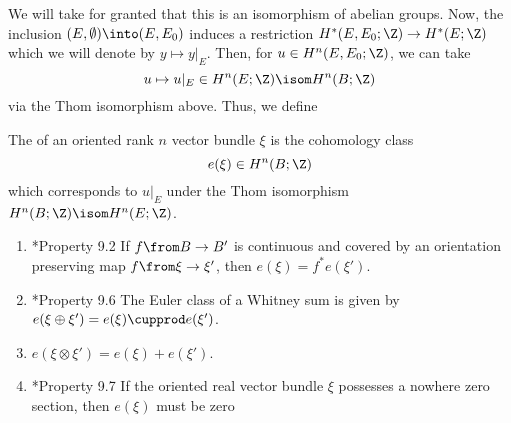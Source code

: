 \documentclass[11pt,leqno,oneside]{amsbook}
\numberwithin{thm}{section}
\begin{document}
We will take for granted that this is an isomorphism of abelian
groups. Now, the inclusion \((E, \emptyset) \into (E, E_0)\) induces a
restriction \(H^*(E,E_0;\Z) \to H^*(E;\Z)\) which we will denote by
\(y \mapsto y|_E\). Then, for \(u \in H^n(E,E_0;\Z)\), we can take \[
  u \mapsto u|_E \in H^n(E;\Z) \isom H^n(B;\Z)
\]
via the Thom isomorphism above. Thus, we define
\begin{defn}
  The  of an oriented rank \(n\) vector bundle \(\xi\)
  is the cohomology class \[
    e(\xi) \in H^n(B;\Z)
  \]
  which corresponds to \(u|_E\) under the Thom isomorphism
  \(H^n(B;\Z) \isom H^n(E;\Z)\).
\end{defn}
\begin{prop}\label{euler-class-props}
  \begin{enumerate}
  \item \cite{milnor-stasheff}*{Property 9.2} If \(f \from B \to B'\)
    is continuous and covered by an orientation preserving map \(f
    \from \xi \to \xi'\), then \(e(\xi) = f^*e(\xi')\).
  \item \cite{milnor-stasheff}*{Property 9.6} The Euler class of a
    Whitney sum is given by \(e(\xi \oplus \xi') = e(\xi) \cupprod
    e(\xi')\).
  \item \(e(\xi \otimes \xi') = e(\xi) + e(\xi')\).
  \item \cite{milnor-stasheff}*{Property 9.7} If the oriented real
    vector bundle \(\xi\) possesses a nowhere 
    zero section, then \(e(\xi)\) must be zero
  \end{enumerate}
\end{prop}
\end{document}
